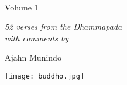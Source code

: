 
\cleartorecto
\thispagestyle{empty}

\vspace*{1em}

{\centering

\\[0.4\baselineskip]
Volume 1
\vspace*{3\baselineskip}

{\itshape 52 verses from the Dhammapada\\
with comments by}

\vspace*{2\baselineskip}
Ajahn Munindo

\vfill

\texttt{[image: buddho.jpg]}
\vspace*{1.3em}


}
